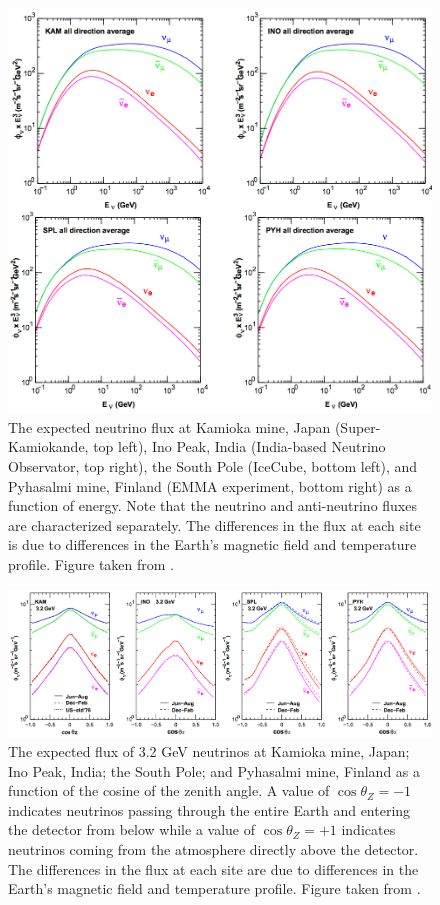 \begin{figure}[!h]
\centering
\includegraphics[width=0.6\linewidth]{honda15_en.png}
\caption[Expected neutrino flux as a function of energy]{The expected neutrino flux at Kamioka mine, Japan (Super-Kamiokande, top left), Ino Peak, India (India-based Neutrino Observator, top right), the South Pole (IceCube, bottom left), and Pyhasalmi mine, Finland (EMMA experiment, bottom right) as a function of energy. Note that the neutrino and anti-neutrino fluxes are characterized separately. The differences in the flux at each site is due to differences in the Earth's magnetic field and temperature profile. Figure taken from \cite{Honda-2015}.}
\label{fig:honda_en}
\end{figure}

\begin{figure}[!h]
\centering
\includegraphics[width=\linewidth]{honda15_coszen.png}
\caption[Expected neutrino flux as a function of direction]{The expected flux of 3.2 GeV neutrinos at Kamioka mine, Japan; Ino Peak, India; the South Pole; and Pyhasalmi mine, Finland as a function of the cosine of the zenith angle. A value of $\cos \theta_Z=-1$ indicates neutrinos passing through the entire Earth and entering the detector from below while a value of $\cos \theta_Z=+1$ indicates neutrinos coming from the atmosphere directly above the detector. The differences in the flux at each site are due to differences in the Earth's magnetic field and temperature profile. Figure taken from \cite{Honda-2015}.}
\label{fig:honda_coszen}
\end{figure}

